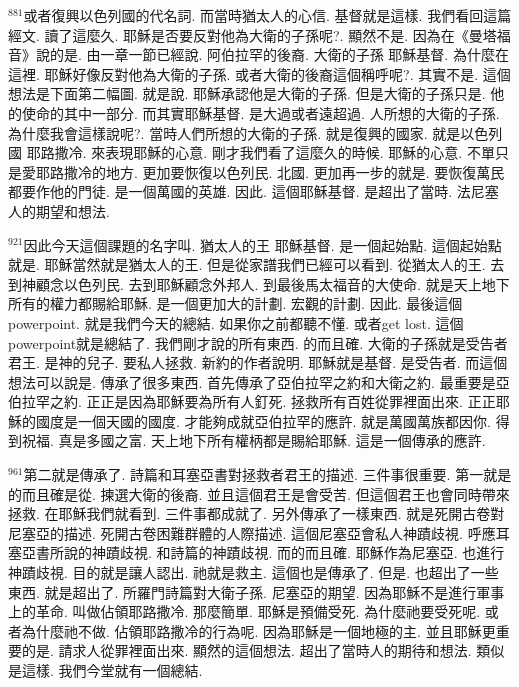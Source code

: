 \documentclass{book}
\begin{document}
$^{881}$或者復興以色列國的代名詞.
而當時猶太人的心信.
基督就是這樣.
我們看回這篇經文.
讀了這麼久.
耶穌是否要反對他為大衛的子孫呢?.
顯然不是.
因為在《曼塔福音》說的是.
由一章一節已經說.
阿伯拉罕的後裔.
大衛的子孫 耶穌基督.
為什麼在這裡.
耶穌好像反對他為大衛的子孫.
或者大衛的後裔這個稱呼呢?.
其實不是.
這個想法是下面第二幅圖.
就是說.
耶穌承認他是大衛的子孫.
但是大衛的子孫只是.
他的使命的其中一部分.
而其實耶穌基督.
是大過或者遠超過.
人所想的大衛的子孫.
為什麼我會這樣說呢?.
當時人們所想的大衛的子孫.
就是復興的國家.
就是以色列國 耶路撒冷.
來表現耶穌的心意.
剛才我們看了這麼久的時候.
耶穌的心意.
不單只是愛耶路撒冷的地方.
更加要恢復以色列民.
北國.
更加再一步的就是.
要恢復萬民都要作他的門徒.
是一個萬國的英雄.
因此.
這個耶穌基督.
是超出了當時.
法尼塞人的期望和想法.

$^{921}$因此今天這個課題的名字叫.
猶太人的王 耶穌基督.
是一個起始點.
這個起始點就是.
耶穌當然就是猶太人的王.
但是從家譜我們已經可以看到.
從猶太人的王.
去到神顧念以色列民.
去到耶穌顧念外邦人.
到最後馬太福音的大使命.
就是天上地下所有的權力都賜給耶穌.
是一個更加大的計劃.
宏觀的計劃.
因此.
最後這個powerpoint.
就是我們今天的總結.
如果你之前都聽不懂.
或者get lost.
這個powerpoint就是總結了.
我們剛才說的所有東西.
的而且確.
大衛的子孫就是受告者君王.
是神的兒子.
要私人拯救.
新約的作者說明.
耶穌就是基督.
是受告者.
而這個想法可以說是.
傳承了很多東西.
首先傳承了亞伯拉罕之約和大衛之約.
最重要是亞伯拉罕之約.
正正是因為耶穌要為所有人釘死.
拯救所有百姓從罪裡面出來.
正正耶穌的國度是一個天國的國度.
才能夠成就亞伯拉罕的應許.
就是萬國萬族都因你.
得到祝福.
真是多國之富.
天上地下所有權柄都是賜給耶穌.
這是一個傳承的應許.

$^{961}$第二就是傳承了.
詩篇和耳塞亞書對拯救者君王的描述.
三件事很重要.
第一就是的而且確是從.
揀選大衛的後裔.
並且這個君王是會受苦.
但這個君王也會同時帶來拯救.
在耶穌我們就看到.
三件事都成就了.
另外傳承了一樣東西.
就是死開古卷對尼塞亞的描述.
死開古卷困難群體的人際描述.
這個尼塞亞會私人神蹟歧視.
呼應耳塞亞書所說的神蹟歧視.
和詩篇的神蹟歧視.
而的而且確.
耶穌作為尼塞亞.
也進行神蹟歧視.
目的就是讓人認出.
祂就是救主.
這個也是傳承了.
但是.
也超出了一些東西.
就是超出了.
所羅門詩篇對大衛子孫.
尼塞亞的期望.
因為耶穌不是進行軍事上的革命.
叫做佔領耶路撒冷.
那麼簡單.
耶穌是預備受死.
為什麼祂要受死呢.
或者為什麼祂不做.
佔領耶路撒冷的行為呢.
因為耶穌是一個地極的主.
並且耶穌更重要的是.
請求人從罪裡面出來.
顯然的這個想法.
超出了當時人的期待和想法.
類似是這樣.
我們今堂就有一個總結.
\end{document}
